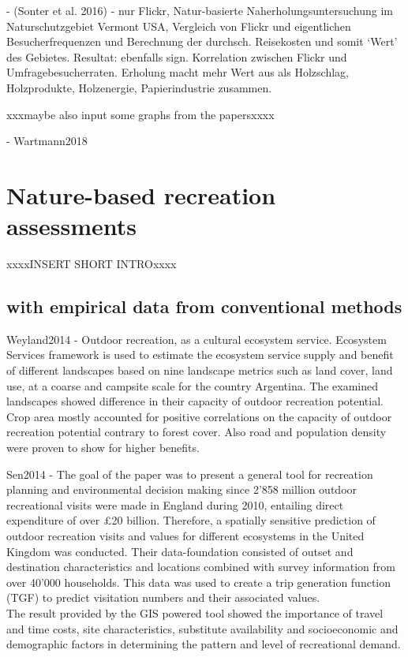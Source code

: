 - (Sonter et al. 2016) - nur Flickr, Natur-basierte Naherholungsuntersuchung im Naturschutzgebiet Vermont USA, Vergleich von Flickr und eigentlichen Besucherfrequenzen und Berechnung der durchsch. Reisekosten und somit ‘Wert’ des Gebietes.
Resultat: ebenfalls sign. Korrelation zwischen Flickr und Umfragebesucherraten. Erholung macht mehr Wert aus als Holzschlag, Holzprodukte, Holzenergie, Papierindustrie zusammen.

xxxmaybe also input some graphs from the papersxxxx

- Wartmann2018

\section{Nature-based recreation assessments}
xxxxINSERT SHORT INTROxxxx
\subsection{with empirical data from conventional methods}
Weyland2014 - Outdoor recreation, as a cultural ecosystem service. Ecosystem Services framework is used to estimate the ecosystem service supply and benefit of different landscapes based on nine landscape metrics such as land cover, land use, at a coarse and campsite scale for the country Argentina. The examined landscapes showed difference in their capacity of outdoor recreation potential. Crop area mostly accounted for positive correlations on the capacity of outdoor recreation potential contrary to forest cover. Also road and population density were proven to show for higher benefits.

Sen2014 - The goal of the paper was to present a general tool for recreation planning and environmental decision making since 2'858 million outdoor recreational visits were made in England during 2010, entailing direct expenditure of over £20 billion. Therefore, a spatially sensitive prediction of outdoor recreation visits and values for different ecosystems in the United Kingdom was conducted. Their data-foundation consisted of outset and destination characteristics and locations combined with survey information from over 40'000 households. This data was used to create a trip generation function (TGF) to predict visitation numbers and their associated values.\\
The result provided by the GIS powered tool showed the importance of travel and time costs, site characteristics, substitute availability and socioeconomic and demographic factors in determining the pattern and level of recreational demand.

